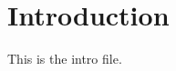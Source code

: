 \documentclass[main.tex]{subfiles}
\begin{document}
\section{Introduction}

This is the intro file.
\end{document}

